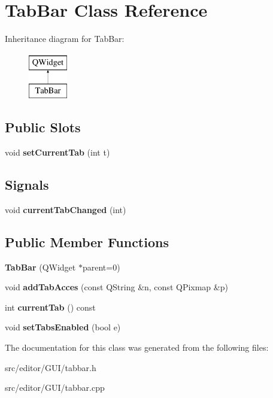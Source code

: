 \hypertarget{class_tab_bar}{}\section{Tab\+Bar Class Reference}
\label{class_tab_bar}
Inheritance diagram for Tab\+Bar\+:\begin{figure}[H]
\begin{center}
\leavevmode
\includegraphics[height=2.000000cm]{class_tab_bar}
\end{center}
\end{figure}
\subsection*{Public Slots}
\begin{DoxyCompactItemize}
\item 
\hypertarget{class_tab_bar_a71b20e36e9d73a3ab7de30af404b4f67}{}\label{class_tab_bar_a71b20e36e9d73a3ab7de30af404b4f67} 
void {\bfseries set\+Current\+Tab} (int t)
\end{DoxyCompactItemize}
\subsection*{Signals}
\begin{DoxyCompactItemize}
\item 
\hypertarget{class_tab_bar_af1823815958705f27ab8e7a90262c27e}{}\label{class_tab_bar_af1823815958705f27ab8e7a90262c27e} 
void {\bfseries current\+Tab\+Changed} (int)
\end{DoxyCompactItemize}
\subsection*{Public Member Functions}
\begin{DoxyCompactItemize}
\item 
\hypertarget{class_tab_bar_ad91da41e8bfec9cf184f36b49ba4bf6b}{}\label{class_tab_bar_ad91da41e8bfec9cf184f36b49ba4bf6b} 
{\bfseries Tab\+Bar} (Q\+Widget $\ast$parent=0)
\item 
\hypertarget{class_tab_bar_a5d781313049c908d0276bae3111cda5c}{}\label{class_tab_bar_a5d781313049c908d0276bae3111cda5c} 
void {\bfseries add\+Tab\+Acces} (const Q\+String \&n, const Q\+Pixmap \&p)
\item 
\hypertarget{class_tab_bar_a9bb9332a2b01e0d6048d60ed354c1ddb}{}\label{class_tab_bar_a9bb9332a2b01e0d6048d60ed354c1ddb} 
int {\bfseries current\+Tab} () const
\item 
\hypertarget{class_tab_bar_a6bb891b77ab937e8d97022cf7d46cf3a}{}\label{class_tab_bar_a6bb891b77ab937e8d97022cf7d46cf3a} 
void {\bfseries set\+Tabs\+Enabled} (bool e)
\end{DoxyCompactItemize}


The documentation for this class was generated from the following files\+:\begin{DoxyCompactItemize}
\item 
src/editor/\+G\+U\+I/tabbar.\+h\item 
src/editor/\+G\+U\+I/tabbar.\+cpp\end{DoxyCompactItemize}
